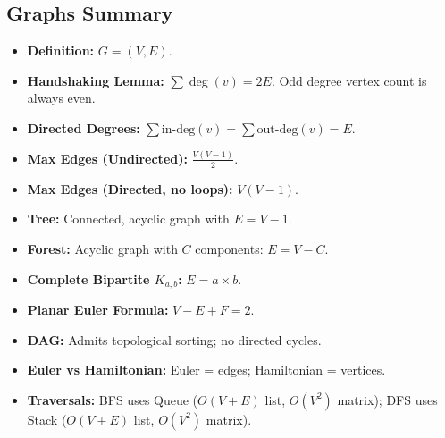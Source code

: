 \subsection{Graphs Summary}
\begin{itemize}
    \item \textbf{Definition:} $G = (V, E)$.
    \item \textbf{Handshaking Lemma:} $\sum \deg(v) = 2E$. Odd degree vertex count is always even.
    \item \textbf{Directed Degrees:} $\sum \text{in-deg}(v) = \sum \text{out-deg}(v) = E$.
    \item \textbf{Max Edges (Undirected):} $\frac{V(V-1)}{2}$.
    \item \textbf{Max Edges (Directed, no loops):} $V(V-1)$.
    \item \textbf{Tree:} Connected, acyclic graph with $E = V - 1$.
    \item \textbf{Forest:} Acyclic graph with $C$ components: $E = V - C$.
    \item \textbf{Complete Bipartite $K_{a,b}$:} $E = a \times b$.
    \item \textbf{Planar Euler Formula:} $V - E + F = 2$.
    \item \textbf{DAG:} Admits topological sorting; no directed cycles.
    \item \textbf{Euler vs Hamiltonian:} Euler = edges; Hamiltonian = vertices.
    \item \textbf{Traversals:} BFS uses Queue ($O(V+E)$ list, $O(V^2)$ matrix); DFS uses Stack ($O(V+E)$ list, $O(V^2)$ matrix).
\end{itemize}

